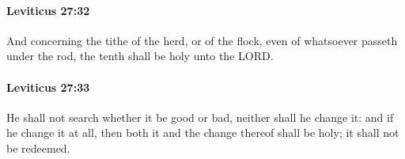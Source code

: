 		\paragraph{Leviticus 27:32} %
			\label{LEVITICUS-27-32}

			And concerning the tithe of the herd, or of the flock, even of whatsoever passeth under the rod, the tenth shall be holy unto the LORD.


		\paragraph{Leviticus 27:33} %
			\label{LEVITICUS-27-33}

			He shall not search whether it be good or bad, neither shall he change it: and if he change it at all, then both it and the change thereof shall be holy; it shall not be redeemed.


